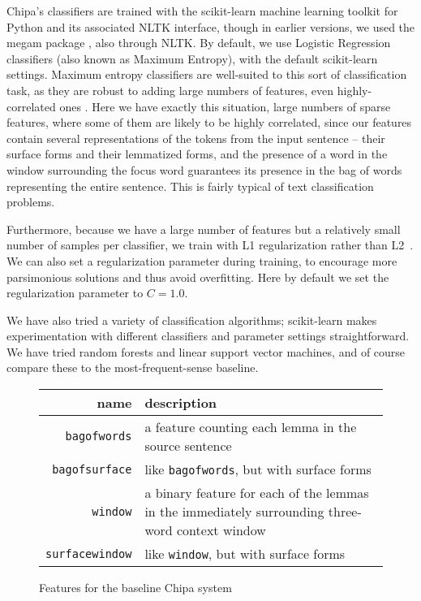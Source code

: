 Chipa's classifiers are trained with the scikit-learn machine learning toolkit
\cite{scikit-learn} for Python and its associated NLTK interface, though in
earlier versions, we used the megam package \cite{daume04cg-bfgs}, also through
NLTK. By default, we use Logistic Regression classifiers (also known as
Maximum Entropy), with the default scikit-learn settings.
Maximum entropy classifiers are well-suited to this sort of classification
task, as they are robust to adding large numbers of features, even
highly-correlated ones \cite{nigam1999using}. Here we have exactly this
situation, large numbers of sparse features, where some of them are likely to
be highly correlated, since our features contain several representations of the
tokens from the input sentence -- their surface forms and their lemmatized
forms, and the presence of a word in the window surrounding the focus word
guarantees its presence in the bag of words representing the entire sentence.
This is fairly typical of text classification problems.

Furthermore, because we have a large number of features but a relatively small
number of samples per classifier, we train with L1 regularization rather than
L2~\cite{ng2004feature}.
We can also set a regularization parameter during training, to encourage
more parsimonious solutions and thus avoid overfitting.
Here by default we set the regularization parameter to $C=1.0$.

We have also tried a variety of classification algorithms; scikit-learn makes
experimentation with different classifiers and parameter settings
straightforward. We have tried random forests and linear support vector
machines, and of course compare these to the most-frequent-sense baseline.


\begin{figure*}
  \begin{centering}
  \begin{tabular}{|r|p{11cm}|}
    \hline
    name          & description  \\
    \hline
    \texttt{bagofwords}    & a feature counting each lemma in the source sentence \\
    \hline
    \texttt{bagofsurface}  & like \texttt{bagofwords}, but with surface forms \\
    \hline
    \texttt{window}       & a binary feature for each of the lemmas in the immediately surrounding three-word context window \\
    \hline
    \texttt{surfacewindow} & like \texttt{window}, but with surface forms \\
    \hline
  \end{tabular}
  \end{centering}
  \caption{Features for the baseline Chipa system}
  \label{fig:baselinefeatures}
\end{figure*}

